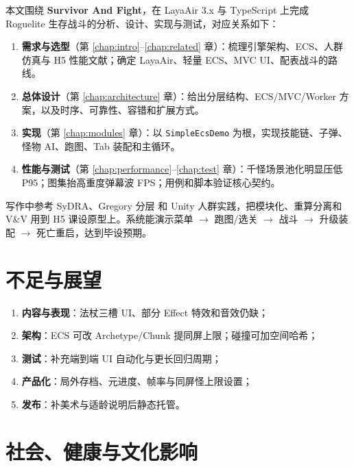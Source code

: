 \documentclass[UTF8,a4paper]{ctexart}
\begin{document}
本文围绕 \textbf{Survivor And Fight}，在 LayaAir 3.x 与 TypeScript 上完成 Roguelite 生存战斗的分析、设计、实现与测试，对应关系如下：

\begin{enumerate}[label=(\arabic*)]
  \item \textbf{需求与选型}（第 \ref{chap:intro}--\ref{chap:related} 章）：梳理引擎架构、ECS、人群仿真与 H5 性能文献；确定 LayaAir、轻量 ECS、MVC UI、配表战斗的路线。
  \item \textbf{总体设计}（第 \ref{chap:architecture} 章）：给出分层结构、ECS/MVC/Worker 方案，以及时序、可靠性、容错和扩展方式。
  \item \textbf{实现}（第 \ref{chap:modules} 章）：以 \texttt{SimpleEcsDemo} 为根，实现技能链、子弹、怪物 AI、跑图、Tab 装配和主循环。
  \item \textbf{性能与测试}（第 \ref{chap:performance}--\ref{chap:test} 章）：千怪场景池化明显压低 P95；图集抬高重度弹幕波 FPS；用例和脚本验证核心契约。
\end{enumerate}

写作中参考 SyDRA\cite{ullmann2025sydra}、Gregory 分层\cite{gregory2018game} 和 Unity 人群实践\cite{cantrell2018unity}，把模块化、重算分离和 V\&V 用到 H5 课设原型上。系统能演示菜单 $\rightarrow$ 跑图/选关 $\rightarrow$ 战斗 $\rightarrow$ 升级装配 $\rightarrow$ 死亡重启，达到毕设预期。

\section{不足与展望}

\begin{enumerate}[label=\arabic*.]
  \item \textbf{内容与表现}：法杖三槽 UI、部分 Effect 特效和音效仍缺；
  \item \textbf{架构}：ECS 可改 Archetype/Chunk 提同屏上限\cite{ullmann2023coupling}；碰撞可加空间哈希；
  \item \textbf{测试}：补充端到端 UI 自动化与更长回归周期\cite{petty2010vv}；
  \item \textbf{产品化}：局外存档、元进度、帧率与同屏怪上限设置；
  \item \textbf{发布}：补美术与适龄说明后静态托管。
\end{enumerate}

\section{社会、健康与文化影响}
\end{document}
